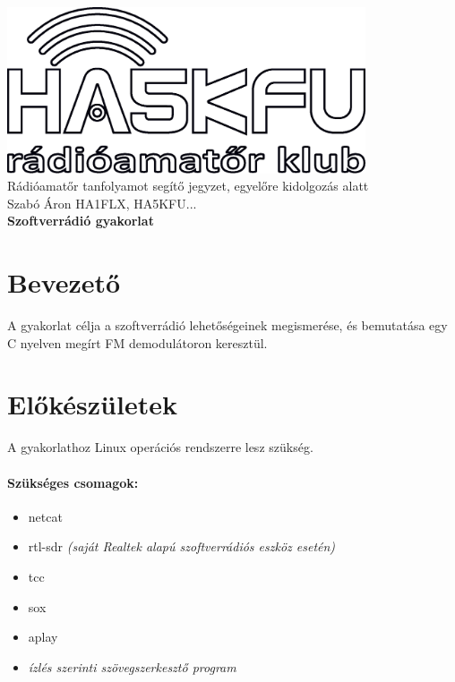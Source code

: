 \documentclass[12pt,a4paper]{article}
\begin{document}
\begin{center}
\includegraphics[width=300pt,keepaspectratio]{figures/ha5kfu.eps}
\\[0.5cm]
Rádióamatőr tanfolyamot segítő jegyzet, egyelőre kidolgozás alatt \\
Szabó Áron HA1FLX, HA5KFU... %
\\[1cm]

{\huge \bfseries Szoftverrádió gyakorlat \\[2cm]}



\end{center}

\renewcommand{\contentsname}{Tartalom}\tableofcontents 
\newpage

\newpage

\section{Bevezető}
A gyakorlat célja a szoftverrádió lehetőségeinek megismerése, és bemutatása egy C nyelven megírt FM demodulátoron keresztül.

\section{Előkészületek}
A gyakorlathoz Linux operációs rendszerre lesz szükség.

\paragraph{Szükséges csomagok:} 
\begin{itemize}
	\item netcat
	\item rtl-sdr \textit{(saját Realtek alapú szoftverrádiós eszköz esetén)}
	\item tcc
	\item sox
	\item aplay
	\item \textit{ízlés szerinti szövegszerkesztő program }

\end{itemize}
\end{document}
